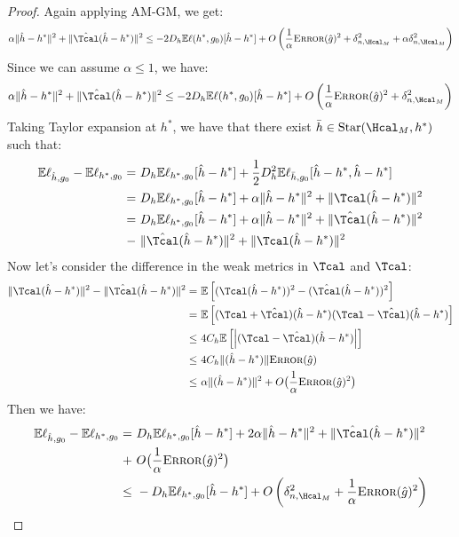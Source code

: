 \documentclass[12pt]{extarticle} %
\newcommand{\E}{\mathbb{E}}
\newcommand{\error}{\ensuremath{\textsc{Error}}}
\begin{document}
\begin{proof}
Again applying AM-GM, we get:
\begin{align*}
    \alpha\|\hat{h}-h^*\|^2 + \|\hat{\Tcal}(\hat{h}-h^*)\|^2\leq - 2 D_{h}\E\ell(h^*,g_0)[\hat{h}-h^*]  +O\left( \frac{1}{\alpha} \error(\hat{g})^2 + \delta_{n,\Hcal_M}^2 + \alpha\delta_{n,\Hcal_M}^2\right)
\end{align*}
Since we can assume $\alpha\leq 1$, we have:
\begin{align*}
        \alpha\|\hat{h}-h^*\|^2 + \|\hat{\Tcal}(\hat{h}-h^*)\|^2\leq - 2 D_{h}\E\ell(h^*,g_0)[\hat{h}-h^*]  +O\left( \frac{1}{\alpha} \error(\hat{g})^2 + \delta_{n,\Hcal_M}^2 \right)
\end{align*}
Taking Taylor expansion at $h^*$, we have that there exist $\bar{h}\in\text{Star}(\Hcal_M,h^*)$ such that:
\begin{align*}
    \E\ell_{\hat{h},g_0} -  \E\ell_{h^*,g_0} = ~& D_{h}\E\ell_{h^*,g_0}[\hat{h}-h^*] + \frac{1}{2}D_{h}^2\E\ell_{\bar{h},g_0}[\hat{h}-h^*,\hat{h}-h^*]\\ 
    =~& D_{h}\E\ell_{h^*,g_0}[\hat{h}-h^*] + \alpha\|\hat{h}-h^*\|^2 + \|\Tcal(\hat{h}-h^*)\|^2 \\
    =~& D_{h}\E\ell_{h^*,g_0}[\hat{h}-h^*] + \alpha\|\hat{h}-h^*\|^2 + \|\hat{\Tcal}(\hat{h}-h^*)\|^2 \\
    -~& \|\hat{\Tcal}(\hat{h}-h^*)\|^2 + \|\Tcal(\hat{h}-h^*)\|^2\\
\end{align*}
Now let's consider the difference in the weak metrics in $\Tcal$ and $\Tcal$:
\begin{align*}
    \|\Tcal(\hat{h}-h^*)\|^2 - \|\hat{\Tcal}(\hat{h}-h^*)\|^2 =~& \E\left[(\Tcal(\hat{h}-h^*))^2-(\hat{\Tcal}(\hat{h}-h^*))^2\right]\\
    =~&\E\left[(\Tcal+\hat{\Tcal})(\hat{h}-h^*)(\Tcal-\hat{\Tcal})(\hat{h}-h^*)\right]\\
    \leq~& 4C_h\E\left[\left|(\Tcal-\hat{\Tcal})(\hat{h}-h^*)\right|\right]\\
    \leq~& 4C_h \|(\hat{h}-h^*)\|\error(\hat{g})\\
    \leq~& \alpha \|(\hat{h}-h^*)\|^2 + O\big(\frac{1}{\alpha}\error(\hat{g})^2\big)
\end{align*}
Then we have:
\begin{align*}
    \E\ell_{\hat{h},g_0} -  \E\ell_{h^*,g_0} 
    =~& D_{h}\E\ell_{h^*,g_0}[\hat{h}-h^*] + 2\alpha\|\hat{h}-h^*\|^2 + \|\hat{\Tcal}(\hat{h}-h^*)\|^2 \\
    +~&O\big(\frac{1}{\alpha}\error(\hat{g})^2\big)\\
    \leq~& -D_{h}\E\ell_{h^*,g_0}[\hat{h}-h^*]+  O\left(\delta_{n,\Hcal_M}^2  + \frac{1}{\alpha}\error(\hat{g})^2\right)\\
\end{align*}



\end{proof}
\end{document}
